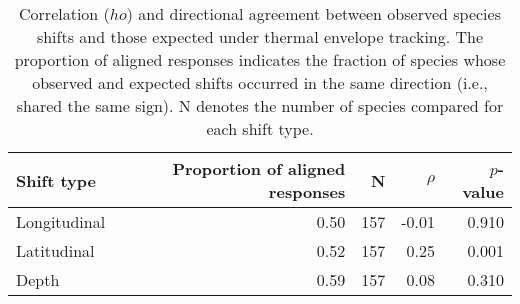\begin{table}

\caption{\label{tab:exp_obs}Correlation ($
ho$) and directional agreement between observed species shifts and those expected under thermal envelope tracking. The proportion of aligned responses indicates the fraction of species whose observed and expected shifts occurred in the same direction (i.e., shared the same sign). N denotes the number of species compared for each shift type.}
\centering
\begin{tabular}[t]{lrrrr}
\toprule
Shift type & Proportion of aligned responses & N & $\rho$ & $p$-value\\
\midrule
Longitudinal & 0.50 & 157 & -0.01 & 0.910\\
Latitudinal & 0.52 & 157 & 0.25 & 0.001\\
Depth & 0.59 & 157 & 0.08 & 0.310\\
\bottomrule
\end{tabular}
\end{table}
